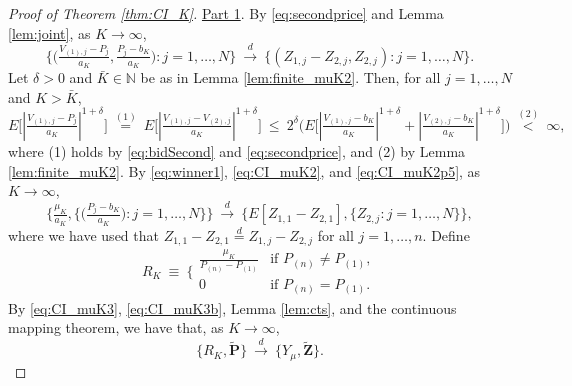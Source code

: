 \begin{proof}[Proof of Theorem \ref{thm:CI_K}]
\underline{Part 1}. By \eqref{eq:secondprice} and Lemma \ref{lem:joint}, as $K\to \infty$,
\begin{equation}
\big\{\big(\tfrac{V_{(1),j}-P_{j}}{a_{K}},\tfrac{P_{j}-b_{K}}{a_{K}}\big) :j=1,\ldots ,N\big\}~\overset{d}{\to } ~\{(Z_{1,j}-Z_{2,j},Z_{2,j}):j=1,\ldots ,N\} . \label{eq:CI_muK2}
\end{equation}
Let $\delta >0$ and $\bar{K} \in \mathbb{N}$ be as in Lemma \ref{lem:finite_muK2}. Then, for all $j =1,\dots,N$ and $K>\bar{K}$,
\begin{equation}
E\big[ | \tfrac{V_{(1),j}-P_{j}}{a_{K}}| ^{1+\delta }\big] ~\overset{(1)}{=}~
E\big[ |\tfrac{V_{( 1) ,j}-V_{(2) ,j}}{a_{K}}| ^{1+\delta }\big]~\leq~ 2^{\delta }\big( E\big[ | \tfrac{V_{( 1) ,j}-b_{K}}{a_{K}}| ^{1+\delta } +  | \tfrac{V_{( 2) ,j}-b_{K}}{a_{K}}|^{1+\delta }\big] \big)~\overset{(2)}{<}~\infty ,  \label{eq:CI_muK2p5}
\end{equation}
where (1) holds by \eqref{eq:bidSecond} and \eqref{eq:secondprice}, and (2) by Lemma \ref{lem:finite_muK2}. By \eqref{eq:winner1}, \eqref{eq:CI_muK2}, and \eqref{eq:CI_muK2p5}, as $K\to \infty$,
\begin{equation}
\big\{ \tfrac{\mu _{K}}{a_{K}},\big\{\big( \tfrac{P_{j}-b_{K}}{a_{K}} \big) :j=1,\ldots ,N \big\} \big\}~
\overset{d}{\to }~ \{ E [Z_{1,1} - Z_{2,1}], \{ Z_{2,j} : j=1,\ldots ,N \} \},\label{eq:CI_muK3}
\end{equation}
where we have used that $Z_{1,1}-Z_{2,1}\overset{d}{=}Z_{1,j}-Z_{2,j}$ for all $j=1,\ldots ,n$. Define
\begin{equation}
R_{K}~\equiv ~\bigg\{ 
\begin{array}{cc}
\tfrac{\mu _{K}}{P_{(n)}-P_{(1)}} & \text{if }P_{(n)}\not=P_{(1)}, \\ 
0 & \text{if }P_{(n)}=P_{(1)}.
\end{array}
  \label{eq:CI_muK3b}
\end{equation}
By \eqref{eq:CI_muK3}, \eqref{eq:CI_muK3b}, Lemma \ref{lem:cts}, and the continuous mapping theorem, we have that, as $K\to \infty $,
\begin{equation}
\{R_{K},\mathbf{\tilde{P}}\}~\overset{d}{\to }~\{Y_{\mu },\mathbf{ \tilde{Z}}\}. \label{eq:CI_muK4}
\end{equation}


\end{proof}
